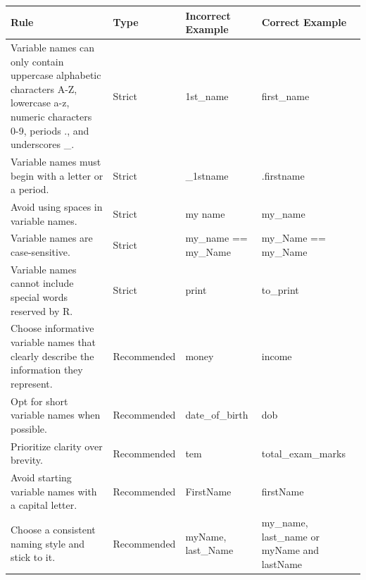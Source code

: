 \documentclass[
]{book}
\begin{document}
\begin{longtable}[]{@{}
  >{\raggedright\arraybackslash}p{}
  >{\raggedright\arraybackslash}p{}
  >{\raggedright\arraybackslash}p{}
  >{\raggedright\arraybackslash}p{}@{}}
\toprule\noalign{}
\begin{minipage}[b]{\linewidth}\raggedright
Rule
\end{minipage} & \begin{minipage}[b]{\linewidth}\raggedright
Type
\end{minipage} & \begin{minipage}[b]{\linewidth}\raggedright
Incorrect Example
\end{minipage} & \begin{minipage}[b]{\linewidth}\raggedright
Correct Example
\end{minipage} \\
\midrule\noalign{}
\endhead
\bottomrule\noalign{}
\endlastfoot
Variable names can only contain uppercase alphabetic characters A-Z, lowercase a-z, numeric characters 0-9, periods ., and underscores \_. & Strict & 1st\_name & first\_name \\
Variable names must begin with a letter or a period. & Strict & \_1stname & .firstname \\
Avoid using spaces in variable names. & Strict & my name & my\_name \\
Variable names are case-sensitive. & Strict & my\_name == my\_Name & my\_Name == my\_Name \\
Variable names cannot include special words reserved by R. & Strict & print & to\_print \\
Choose informative variable names that clearly describe the information they represent. & Recommended & money & income \\
Opt for short variable names when possible. & Recommended & date\_of\_birth & dob \\
Prioritize clarity over brevity. & Recommended & tem & total\_exam\_marks \\
Avoid starting variable names with a capital letter. & Recommended & FirstName & firstName \\
Choose a consistent naming style and stick to it. & Recommended & myName, last\_Name & my\_name, last\_name or myName and lastName \\
\end{longtable}

  
\end{document}
